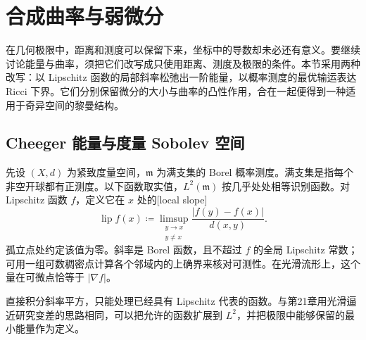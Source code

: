 
% 
% 
% 

\section{合成曲率与弱微分}
\label{g3:sec:2904}

在几何极限中，距离和测度可以保留下来，坐标中的导数却未必还有意义。要继续讨论能量与曲率，须把它们改写成只使用距离、测度及极限的条件。本节采用两种改写：以 Lipschitz 函数的局部斜率松弛出一阶能量，以概率测度的最优输运表达 Ricci 下界。它们分别保留微分的大小与曲率的凸性作用，合在一起便得到一种适用于奇异空间的黎曼结构。

\subsection{Cheeger 能量与度量 Sobolev 空间}
\label{g3:subsec:2904:01}
先设 \((X,d)\) 为紧致度量空间，\(\mathfrak m\) 为满支集的 Borel 概率测度。满支集是指每个非空开球都有正测度。以下函数取实值，\(L^2(\mathfrak m)\) 按几乎处处相等识别函数。对 Lipschitz 函数 \(f\)，定义它在 \(x\) 处的[local slope]
\begin{equation}\label{g3:eq:metric-local-slope}
	\operatorname{lip}f(x)\coloneqq
	\limsup_{\substack{y\to x\\y\ne x}}
	\frac{|f(y)-f(x)|}{d(x,y)}.
\end{equation}
孤立点处约定该值为零。斜率是 Borel 函数，且不超过 \(f\) 的全局 Lipschitz 常数；可用一组可数稠密点计算各个邻域内的上确界来核对可测性。在光滑流形上，这个量在可微点恰等于 \(|\nabla f|\)。

\ProseParagraphBreak
直接积分斜率平方，只能处理已经具有 Lipschitz 代表的函数。与第21章用光滑逼近研究变差的思路相同，可以把允许的函数扩展到 \(L^2\)，并把极限中能够保留的最小能量作为定义。

